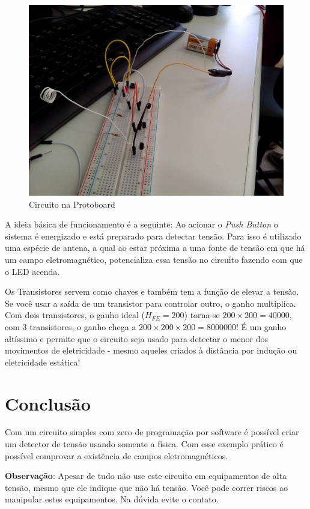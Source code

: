 \begin{figure}[h]
    \includegraphics[scale=0.15]{img/IMG_20160521_101811.jpg}
    \caption{Circuito na Protoboard}
\end{figure}

A ideia básica de funcionamento é a seguinte: Ao acionar o \emph{Push
Button} o sistema é energizado e está preparado para detectar tensão.
Para isso é utilizado uma espécie de antena, a qual ao estar próxima a
uma fonte de tensão em que há um campo eletromagnético, potencializa
essa tensão no circuito fazendo com que o LED acenda.

Os Transistores servem como chaves e também tem a função de elevar a
tensão. Se você usar a saída de um transistor para controlar outro, o
ganho multiplica. Com dois transistores, o ganho ideal ($H_{FE} = 200$)
torna-se $200 \times 200 = 40000$, com 3 transistores, o ganho chega a
$200 \times 200 \times 200 = 8000000$! É um ganho altíssimo e permite
que o circuito seja usado para detectar o menor dos movimentos de
eletricidade - mesmo aqueles criados à distância por indução ou
eletricidade estática!

\section{Conclusão}\label{conclusuxe3o}

Com um circuito simples com zero de programação por software é possível
criar um detector de tensão usando somente a física. Com esse exemplo
prático é possível comprovar a existência de campos eletromagnéticos.

\textbf{Observação}: Apesar de tudo não use este circuito em
equipamentos de alta tensão, mesmo que ele indique que não há tensão.
Você pode correr riscos ao manipular estes equipamentos. Na dúvida evite
o contato.

